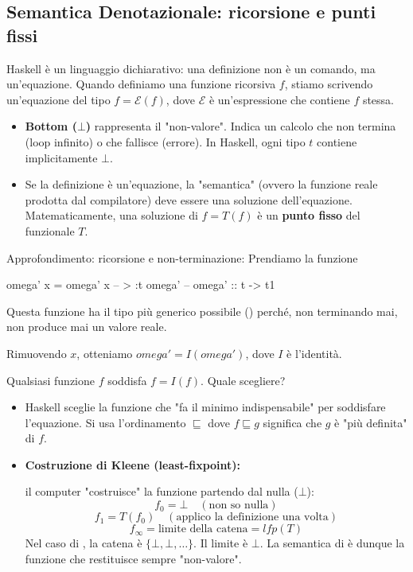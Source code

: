 \documentclass[a4paper,11pt]{report}
\begin{document}
\subsection{Semantica Denotazionale: ricorsione e punti fissi}

Haskell è un linguaggio dichiarativo: una definizione non è un comando, ma un'equazione. 
Quando definiamo una funzione ricorsiva $f$, stiamo scrivendo un'equazione del tipo $f = \mathcal{E}(f)$, dove $\mathcal{E}$ è un'espressione che contiene $f$ stessa.

\begin{itemize}
    \item \textbf{Bottom ($\bot$)} rappresenta il "non-valore". Indica un calcolo che non termina (loop infinito) o che fallisce (errore). In Haskell, ogni tipo $t$ contiene implicitamente $\bot$.
    \item Se la definizione è un'equazione, la "semantica" (ovvero la funzione reale prodotta dal compilatore) deve essere una soluzione dell'equazione. Matematicamente, una soluzione di $f = T(f)$ è un \textbf{punto fisso} del funzionale $T$.
\end{itemize}

\begin{gframe}{Approfondimento: ricorsione e non-terminazione: }
Prendiamo la funzione
\begin{haskellbox}{}
omega' x = omega' x
-- > :t omega'
-- omega' :: t -> t1
\end{haskellbox}
Questa funzione ha il tipo più generico possibile () perché, non terminando mai, non produce mai un valore reale.

Rimuovendo $x$, otteniamo $omega' = I(omega')$, dove $I$ è l'identità.

Qualsiasi funzione $f$ soddisfa $f = I(f)$. Quale scegliere?

\begin{itemize}
    \item Haskell sceglie la funzione che "fa il minimo indispensabile" per soddisfare l'equazione. Si usa l'ordinamento $\sqsubseteq$ dove $f \sqsubseteq g$ significa che $g$ è "più definita" di $f$.
    \item \textbf{Costruzione di Kleene (least-fixpoint):} 

        il computer "costruisce" la funzione partendo dal nulla ($\bot$):
    \[ f_0 = \bot \quad (\text{non so nulla}) \]
    \[ f_1 = T(f_0) \quad (\text{applico la definizione una volta}) \]
    \[ f_{\infty} = \text{limite della catena} = \textit{lfp}(T) \]
    Nel caso di , la catena è $\{\bot, \bot, \dots\}$. Il limite è $\bot$. La semantica di  è dunque la funzione che restituisce sempre "non-valore".
\end{itemize}

\end{gframe}
\end{document}
